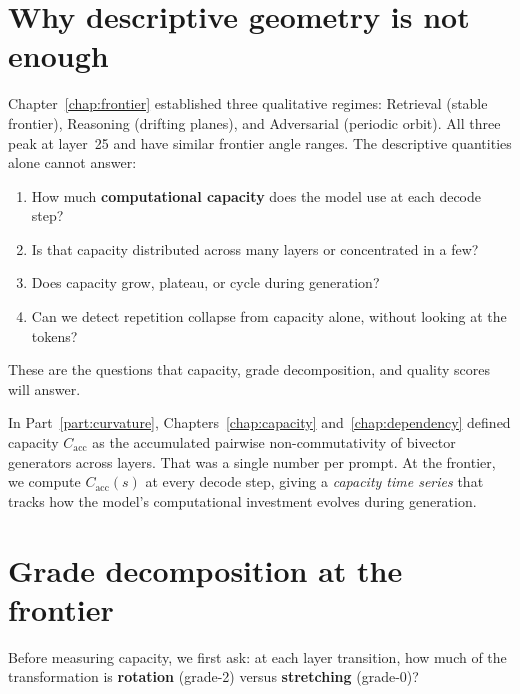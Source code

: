 \documentclass[11pt, twoside, openright]{memoir}
\numberwithin{equation}{chapter}
\begin{document}
\section{Why descriptive geometry is not enough}
\label{sec:cap-motivation}

Chapter~\ref{chap:frontier} established three qualitative
regimes: Retrieval (stable frontier), Reasoning (drifting planes),
and Adversarial (periodic orbit).  All three peak at layer~25
and have similar frontier angle ranges.  The descriptive quantities
alone cannot answer:

\begin{enumerate}[nosep]
\item How much \textbf{computational capacity} does the model use
  at each decode step?
\item Is that capacity distributed across many layers or
  concentrated in a few?
\item Does capacity grow, plateau, or cycle during generation?
\item Can we detect repetition collapse from capacity alone,
  without looking at the tokens?
\end{enumerate}

These are the questions that capacity, grade decomposition, and
quality scores will answer.

\begin{transformer}
In Part~\ref{part:curvature}, Chapters~\ref{chap:capacity}
and~\ref{chap:dependency} defined capacity $C_{\mathrm{acc}}$ as
the accumulated pairwise non-commutativity of bivector generators
across layers.  That was a single number per prompt.  At the
frontier, we compute $C_{\mathrm{acc}}(s)$ at every decode step,
giving a \emph{capacity time series} that tracks how the model's
computational investment evolves during generation.
\end{transformer}


\section{Grade decomposition at the frontier}
\label{sec:cap-grade}

Before measuring capacity, we first ask: at each layer transition,
how much of the transformation is \textbf{rotation} (grade-2)
versus \textbf{stretching} (grade-0)?
\end{document}
